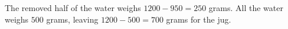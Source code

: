 The removed half of the water weighs $1200-950=250$ grams. All the water weighs $500$ grams, leaving $1200-500=\boxed{700}$ grams for the jug.
